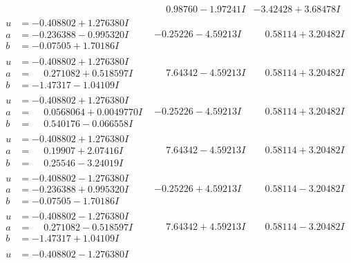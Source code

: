 \documentclass[1p]{elsarticle_modified}
\theoremstyle{definition}
\begin{document}
$$\begin{array}{c|c|c}
 & \phantom{-}0.98760 - 1.97241 I & -3.42428 + 3.68478 I \\ \hline\begin{aligned}
u &= -0.408802 + 1.276380 I \\
a &= -0.236388 - 0.995320 I \\
b &= -0.07505 + 1.70186 I\end{aligned}
 & -0.25226 - 4.59213 I & \phantom{-}0.58114 + 3.20482 I \\ \hline\begin{aligned}
u &= -0.408802 + 1.276380 I \\
a &= \phantom{-}0.271082 + 0.518597 I \\
b &= -1.47317 - 1.04109 I\end{aligned}
 & \phantom{-}7.64342 - 4.59213 I & \phantom{-}0.58114 + 3.20482 I \\ \hline\begin{aligned}
u &= -0.408802 + 1.276380 I \\
a &= \phantom{-}0.0568064 + 0.0049770 I \\
b &= \phantom{-}0.540176 - 0.066558 I\end{aligned}
 & -0.25226 - 4.59213 I & \phantom{-}0.58114 + 3.20482 I \\ \hline\begin{aligned}
u &= -0.408802 + 1.276380 I \\
a &= \phantom{-}0.19907 + 2.07416 I \\
b &= \phantom{-}0.25546 - 3.24019 I\end{aligned}
 & \phantom{-}7.64342 - 4.59213 I & \phantom{-}0.58114 + 3.20482 I \\ \hline\begin{aligned}
u &= -0.408802 - 1.276380 I \\
a &= -0.236388 + 0.995320 I \\
b &= -0.07505 - 1.70186 I\end{aligned}
 & -0.25226 + 4.59213 I & \phantom{-}0.58114 - 3.20482 I \\ \hline\begin{aligned}
u &= -0.408802 - 1.276380 I \\
a &= \phantom{-}0.271082 - 0.518597 I \\
b &= -1.47317 + 1.04109 I\end{aligned}
 & \phantom{-}7.64342 + 4.59213 I & \phantom{-}0.58114 - 3.20482 I \\ \hline\begin{aligned}
u &= -0.408802 - 1.276380 I \\

\end{aligned}
\end{array}$$
\end{document}
